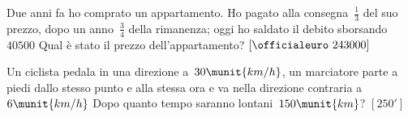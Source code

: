 \begin{htmulticols}{2}
\begin{esercizio}[*]
\label{ese:14.63}
Due anni fa ho comprato un appartamento. Ho pagato alla 
consegna~\(\frac{1}{3}\) 
del suo prezzo, dopo un anno~\(\frac{3}{4}\) della rimanenza; oggi ho saldato 
il 
debito sborsando \officialeuro~\(40500\) Qual è stato il prezzo 
dell'appartamento?
 \hfill \(\left[\officialeuro~243000\right]\)
\end{esercizio}

\begin{esercizio}[*]
\label{ese:14.64}
Un ciclista pedala in una direzione a~\(30\munit{km/h}\), un marciatore parte a 
piedi dallo stesso punto e alla stessa ora e va nella direzione contraria 
a~\(6\munit{km/h}\) Dopo quanto tempo saranno lontani~\(150\munit{km}\)?
 \hfill \(\left[250'\right]\)
\end{esercizio}

% 
% 
% 


\end{htmulticols}
